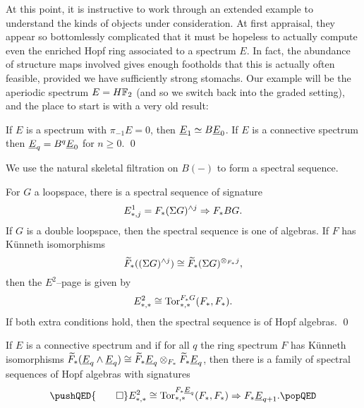 At this point, it is instructive to work through an extended example to understand the kinds of objects under consideration.  At first appraisal, they appear so bottomlessly complicated that it must be hopeless to actually compute even the enriched Hopf ring associated to a spectrum \(E\).  In fact, the abundance of structure maps involved gives enough footholds that this is actually often feasible, provided we have sufficiently strong stomachs.  Our example will be the aperiodic spectrum \(E = \HFtwo\) (and so we switch back into the graded setting), and the place to start is with a very old result:
\begin{lemma}
If \(E\) is a spectrum with \(\pi_{-1} E = 0\), then \(\OS{E}{1} \simeq B\OS{E}{0}\).  If \(E\) is a connective spectrum then \(\OS{E}{q} = B^q \OS{E}{0}\) for \(n \ge 0\). \qed
\end{lemma}
\noindent We use the natural skeletal filtration on \(B(-)\) to form a spectral sequence.
\begin{lemma}
For \(G\) a loopspace, there is a spectral sequence of signature \[E^1_{*, j} = F_*(\Sigma G)^{\wedge j} \Rightarrow F_* BG.\]  If \(G\) is a double loopspace, then the spectral sequence is one of algebras.  If \(F\) has K\"unneth isomorphisms \[\widetilde F_*((\Sigma G)^{\wedge j}) \cong \widetilde F_*(\Sigma G)^{\otimes_{F_*} j},\] then the \(E^2\)--page is given by \[E^2_{*, *} \cong \operatorname{Tor}^{F_* G}_{*, *}(F_*, F_*).\]  If both extra conditions hold, then the spectral sequence is of Hopf algebras. \qed
\end{lemma}
\begin{corollary}
If \(E\) is a connective spectrum and if for all \(q\) the ring spectrum \(F\) has K\"unneth isomorphisms \(\widetilde F_*(\OS{E}{q} \sm \OS{E}{q}) \cong \widetilde F_* \OS{E}{q} \otimes_{F_*} \widetilde F_* \OS{E}{q}\), then there is a family of spectral sequences of Hopf algebras with signatures
\[
\pushQED{\qed}
E^2_{*, *} \cong \Tor^{F_* \OS{E}{q}}_{*, *}(F_*, F_*) \Rightarrow F_* \OS{E}{q+1}. \qedhere
\popQED
\]
\end{corollary}

